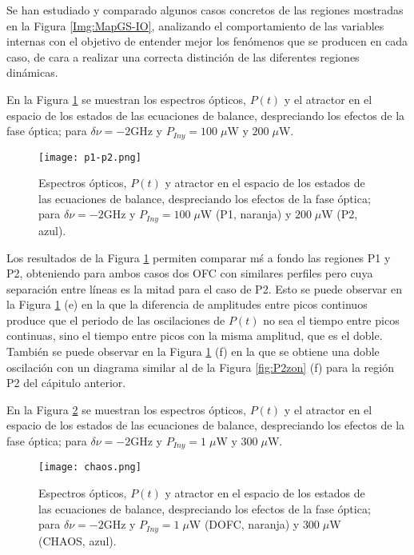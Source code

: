 		Se han estudiado y comparado algunos casos concretos de las regiones mostradas en la Figura \ref{Img:MapGS-IO}, analizando el comportamiento de las variables internas con el objetivo de entender mejor los fen\'omenos que se producen en cada caso, de cara a realizar una correcta distinci\'on de las diferentes regiones din\'amicas.

		En la Figura \ref{fig:p1-p2} se muestran los espectros \'opticos, $P(t)$ y el atractor en el espacio de los estados de las ecuaciones de balance, despreciando los efectos de la fase \'optica; para $\delta\nu = -2$GHz y $P_{Iny} = 100\;\mu$W y $200\;\mu$W.

			\begin{figure}[H]
				\centering
				\texttt{[image: p1-p2.png]}
				\caption{\label{fig:p1-p2}Espectros \'opticos, $P(t)$ y atractor en el espacio de los estados de las ecuaciones de balance, despreciando los efectos de la fase \'optica; para $\delta\nu = -2$GHz y $P_{Iny} = 100\;\mu$W (P1, naranja) y $200\;\mu$W (P2, azul).}	
			\end{figure}

		Los resultados de la Figura \ref{fig:p1-p2} permiten comparar m\'s a fondo las regiones P1 y P2, obteniendo para ambos casos dos OFC con similares perfiles pero cuya separaci\'on entre l\'ineas es la mitad para el caso de P2. Esto se puede observar en la Figura \ref{fig:p1-p2} (e) en la que la diferencia de amplitudes entre picos continuos produce que el periodo de las oscilaciones de $P(t)$ no sea el tiempo entre picos continuas, sino el tiempo entre picos con la misma amplitud, que es el doble. Tambi\'en se puede observar en la Figura \ref{fig:p1-p2} (f) en la que se obtiene una doble oscilación con un diagrama similar al de la Figura \ref{fig:P2zon} (f) para la regi\'on P2 del c\'apitulo anterior.

		En la Figura \ref{fig:chaos} se muestran los espectros \'opticos, $P(t)$ y el atractor en el espacio de los estados de las ecuaciones de balance, despreciando los efectos de la fase \'optica; para $\delta\nu = -2$GHz y $P_{Iny} = 1\;\mu$W y $300\;\mu$W.

			\begin{figure}[H]
				\centering
				\texttt{[image: chaos.png]}
				\caption{\label{fig:chaos}Espectros \'opticos, $P(t)$ y atractor en el espacio de los estados de las ecuaciones de balance, despreciando los efectos de la fase \'optica; para $\delta\nu = -2$GHz y $P_{Iny} = 1\;\mu$W (DOFC, naranja) y $300\;\mu$W (CHAOS, azul).}	
			\end{figure}


